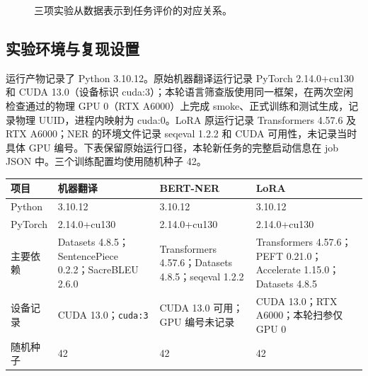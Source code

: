 \documentclass[UTF8,a4paper,12pt,fontset=none]{ctexart}
\begin{document}
\begin{figure}[htbp]
  \centering
  \caption{三项实验从数据表示到任务评价的对应关系。}
  \label{fig:design-overview}
\end{figure}

\subsection{实验环境与复现设置}
运行产物记录了 Python 3.10.12。原始机器翻译运行记录 PyTorch 2.14.0+cu130 和 CUDA 13.0（设备标识 cuda:3）；本轮语言筛查版使用同一框架，在两次空闲检查通过的物理 GPU 0（RTX A6000）上完成 smoke、正式训练和测试生成，记录物理 UUID，进程内映射为 cuda:0。LoRA 原运行记录 Transformers 4.57.6 及 RTX A6000；NER 的环境文件记录 seqeval 1.2.2 和 CUDA 可用性，未记录当时具体 GPU 编号。下表保留原始运行口径，本轮新任务的完整启动信息在 job JSON 中。三个训练配置均使用随机种子 42。

\noindent\begin{tabularx}{\textwidth}{>{\raggedright\arraybackslash}p{}YYY}
\toprule
项目 & 机器翻译 & BERT-NER & LoRA \\
\midrule
Python & 3.10.12 & 3.10.12 & 3.10.12 \\
PyTorch & 2.14.0+cu130 & 2.14.0+cu130 & 2.14.0+cu130 \\
主要依赖 & Datasets 4.8.5；SentencePiece 0.2.2；SacreBLEU 2.6.0 & Transformers 4.57.6；Datasets 4.8.5；seqeval 1.2.2 & Transformers 4.57.6；PEFT 0.21.0；Accelerate 1.15.0；Datasets 4.8.5 \\
设备记录 & CUDA 13.0；\texttt{cuda:3} & CUDA 13.0 可用；GPU 编号未记录 & CUDA 13.0；RTX A6000；本轮扫参仅 GPU 0 \\
随机种子 & 42 & 42 & 42 \\
\bottomrule
\end{tabularx}
\end{document}
